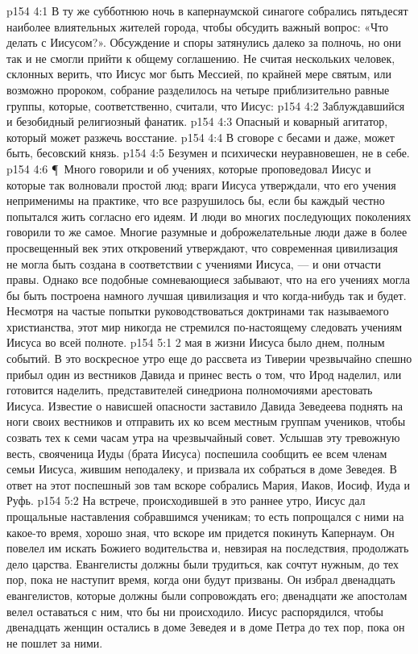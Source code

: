 \vs p154 4:1 В ту же субботнюю ночь в капернаумской синагоге собрались пятьдесят наиболее влиятельных жителей города, чтобы обсудить важный вопрос: «Что делать с Иисусом?». Обсуждение и споры затянулись далеко за полночь, но они так и не смогли прийти к общему соглашению. Не считая нескольких человек, склонных верить, что Иисус мог быть Мессией, по крайней мере святым, или возможно пророком, собрание разделилось на четыре приблизительно равные группы, которые, соответственно, считали, что Иисус:
\vs p154 4:2 \bibnobreakspace Заблуждавшийся и безобидный религиозный фанатик.
\vs p154 4:3 \bibnobreakspace Опасный и коварный агитатор, который может разжечь восстание.
\vs p154 4:4 \bibnobreakspace В сговоре с бесами и даже, может быть, бесовский князь.
\vs p154 4:5 \bibnobreakspace Безумен и психически неуравновешен, не в себе.
\vs p154 4:6 \P\ Много говорили и об учениях, которые проповедовал Иисус и которые так волновали простой люд; враги Иисуса утверждали, что его учения неприменимы на практике, что все разрушилось бы, если бы каждый честно попытался жить согласно его идеям. И люди во многих последующих поколениях говорили то же самое. Многие разумные и доброжелательные люди даже в более просвещенный век этих откровений утверждают, что современная цивилизация не могла быть создана в соответствии с учениями Иисуса, --- и они отчасти правы. Однако все подобные сомневающиеся забывают, что на его учениях могла бы быть построена намного лучшая цивилизация и что когда\hyp{}нибудь так и будет. Несмотря на частые попытки руководствоваться доктринами так называемого христианства, этот мир никогда не стремился по\hyp{}настоящему следовать учениям Иисуса во всей полноте.
\vs p154 5:1 2 мая в жизни Иисуса было днем, полным событий. В это воскресное утро еще до рассвета из Тиверии чрезвычайно спешно прибыл один из вестников Давида и принес весть о том, что Ирод наделил, или готовится наделить, представителей синедриона полномочиями арестовать Иисуса. Известие о нависшей опасности заставило Давида Зеведеева поднять на ноги своих вестников и отправить их ко всем местным группам учеников, чтобы созвать тех к семи часам утра на чрезвычайный совет. Услышав эту тревожную весть, свояченица Иуды (брата Иисуса) поспешила сообщить ее всем членам семьи Иисуса, жившим неподалеку, и призвала их собраться в доме Зеведея. В ответ на этот поспешный зов там вскоре собрались Мария, Иаков, Иосиф, Иуда и Руфь.
\vs p154 5:2 На встрече, происходившей в это раннее утро, Иисус дал прощальные наставления собравшимся ученикам; то есть попрощался с ними на какое\hyp{}то время, хорошо зная, что вскоре им придется покинуть Капернаум. Он повелел им искать Божиего водительства и, невзирая на последствия, продолжать дело царства. Евангелисты должны были трудиться, как сочтут нужным, до тех пор, пока не наступит время, когда они будут призваны. Он избрал двенадцать евангелистов, которые должны были сопровождать его; двенадцати же апостолам велел оставаться с ним, что бы ни происходило. Иисус распорядился, чтобы двенадцать женщин остались в доме Зеведея и в доме Петра до тех пор, пока он не пошлет за ними.
